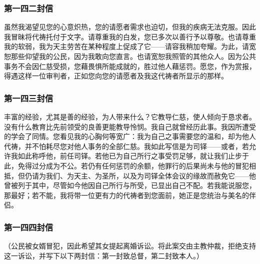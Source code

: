 
\subsubsection{第一四二封信}

虽然我渴望见您的心意炽热，您的请愿者需求也迫切，但我的疾病无法克服。因此我冒昧将代祷托付于文字。请尊重我的白发，您已多次以善行予以尊敬。也请尊重我的软弱，我为天主劳苦在某种程度上促成了它——请容我稍加夸耀。为此，请宽恕那些仰望我的公民，因为我敢向您直言。也请宽恕我照管的其他众人。因为公共事务不会因仁慈受损，您藉畏惧所能成就的，胜过他人藉惩罚。愿您，作为赏报，得遇这样一位审判者，正如您向您的请愿者及我这代祷者所显示的那样。\par


\subsubsection{第一四三封信}

丰富的经验，尤其是善的经验，为人带来什么？它教导仁慈，使人倾向于恳求者。没有什么教育比先前领受的良善更能教导怜悯。我自己就曾经历此事。我因所遭受的学会了同情。您看见我的心胸何等宽广：我为自己之事需要您的温和，却为他人代祷，并不怕耗尽您对他人事务的全部仁慈。我如此写信是为司铎——或者，若允许我如此称呼他，前任司铎。若他已为自己所行之事受罚足够，就让我们止步于此，免得过分成为不公。若仍有任何惩罚的余额，他罪行的后果尚未与他的冒犯相抵，但仍请为我们、为天主、为圣所，以及为司铎全体会议的缘故而赦免它——他曾被列于其中，尽管如今他因自己所行与所受，已显出自己不配。若我能说服您，那最好；若不能，我将带一位更有力的代祷者到您面前，她正是您统治与美名的伴侣。\par


\subsubsection{第一四四封信}

（公民被女婿冒犯，因此希望其女提起离婚诉讼。将此案交由主教仲裁，拒绝支持这一诉讼，并写下以下两封信：第一封致总督，第二封致本人。）\par

